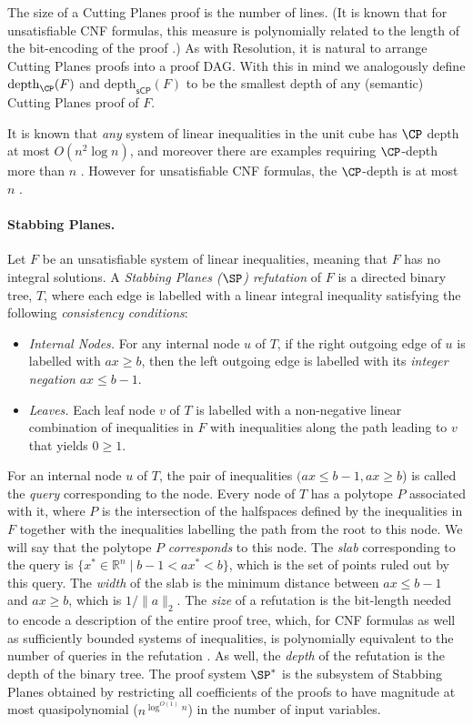 \documentclass[11pt]{article}
\numberwithin{equation}{section}
\theoremstyle{definition}
\theoremstyle{plain}
\newcounter{cor}\renewcommand{\thecor}{1.1.\arabic{cor}}\newenvironment{cor}{\ifnum\value{cor}=0\refstepcounter{cor}\else\PackageError{toc-native-compat}{Unsupported additional cor envelope}{Only the one exact source-observed cor paragraph is allowed.}\fi}{}\providecommand{\corautorefname}{Theorem}
\newcommand{\depth}{\ensuremath{\mathrm{depth}}}
\newcommand{\sCP}{\ensuremath{\mathsf{sCP}}}
\begin{document}
The size of a Cutting Planes proof is the number of lines.
%
%
(It is known that for   %
unsatisfiable CNF %
formulas,  %
this measure is polynomially related to the length of the bit-encoding of
the proof \cite{CookCT87}.)   %
As with Resolution, it is natural to arrange Cutting Planes proofs into a proof DAG.
With this in mind we analogously define $\depth_{\CP}(F)$ and $\depth_{\sCP}(F)$
to be the smallest depth of any (semantic) Cutting Planes proof of $F$. 

It is known that \emph{any} system of linear inequalities in the unit cube has $\CP$ depth at most
$O(n^2 \log n)$, and moreover there
are examples requiring $\CP$-depth more than $n$ \cite{EisenbrandS99}.
However for unsatisfiable CNF formulas,
the $\CP$-depth is at most $n$ \cite{BockmayrEHS99}.

\paragraph{Stabbing Planes.}
Let $F$ be an unsatisfiable system of linear inequalities, meaning that $F$ has no integral solutions.  %
%
%
%
A \emph{Stabbing Planes ($\SP$) refutation} of $F$ is a directed binary tree, $T$, where each edge is labelled with a linear integral inequality satisfying the following \emph{consistency conditions}:
\begin{itemize}
	\item \emph{Internal Nodes.} For any internal node $u$ of $T$, if the right outgoing edge of $u$ is labelled with $ax \geq b$, then the left outgoing edge is labelled with its \emph{integer negation} $ax \leq  b-1 $.
	\item \emph{Leaves.} Each leaf node $v$ of $T$ is labelled with a non-negative linear combination of inequalities in $F$ with inequalities along the path leading to $v$ that yields $0 \geq 1$.
\end{itemize}
For an internal node $u$ of $T$, the pair of inequalities $(ax \le b-1, ax \ge b$) is called the \emph{query} corresponding to the node. Every node of $T$ has a polytope $P$ associated with it, where $P$ is the
%
intersection of the halfspaces defined by the inequalities %
%
%
in $F$ together with the inequalities labelling the path from the root to this node. We will say that the polytope $P$ \emph{corresponds} to this node. 
The \emph{slab} corresponding to the query is $\{ x^* \in \mathbb{R}^n \mid b-1 < ax^* < b \}$, which is the set of points ruled out by this query. The \emph{width} of the slab is the minimum distance between $ax \leq b-1$ and $ax \geq b$, which is $1/\|a\|_2$.
The \emph{size} of a refutation is the bit-length needed to encode a description of the entire proof tree, which, for CNF formulas as well as sufficiently bounded systems of inequalities, is polynomially equivalent to the number of queries  in the refutation \cite{TseitinUpperBound}.
As well, the \emph{depth} of the refutation is the depth of the binary tree.
The proof system $\SP^*$ is the subsystem of Stabbing Planes obtained by restricting all coefficients of the proofs to have magnitude at most quasipolynomial ($n^{\log^{O(1)} n}$) in the number of input variables.
\end{document}
